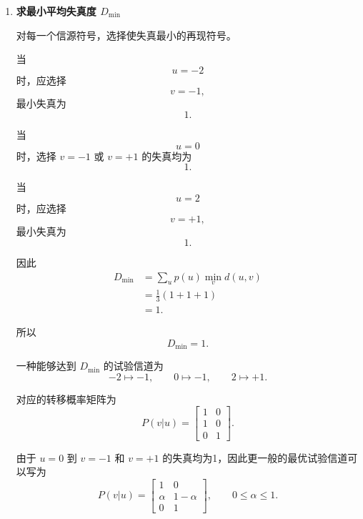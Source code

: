 \documentclass[UTF8,a4paper,12pt]{ctexart}
\begin{document}
\begin{enumerate}[label=\arabic*., leftmargin=2.2em]
更一般地，只要输出与输入无关，即
\[
P(v|u)
=
\begin{bmatrix}
q&1-q\\
q&1-q\\
q&1-q
\end{bmatrix},
\qquad
0\leq q\leq1,
\]
均有
\[
\overline D=\frac{11}{3}.
\]


\item \textbf{求最小平均失真度 $D_{\min}$}

对每一个信源符号，选择使失真最小的再现符号。

当
\[
u=-2
\]
时，应选择
\[
v=-1,
\]
最小失真为
\[
1.
\]

当
\[
u=0
\]
时，选择 $v=-1$ 或 $v=+1$ 的失真均为
\[
1.
\]

当
\[
u=2
\]
时，应选择
\[
v=+1,
\]
最小失真为
\[
1.
\]

因此
\[
\begin{aligned}
D_{\min}
&=
\sum_u p(u)\min_v d(u,v)\\
&=
\frac13(1+1+1)\\
&=1.
\end{aligned}
\]

所以
\[
\boxed{D_{\min}=1}.
\]

一种能够达到 $D_{\min}$ 的试验信道为
\[
-2\mapsto-1,
\qquad
0\mapsto-1,
\qquad
2\mapsto+1.
\]

对应的转移概率矩阵为
\[
\boxed{
P(v|u)
=
\begin{bmatrix}
1&0\\
1&0\\
0&1
\end{bmatrix}
}.
\]

由于 $u=0$ 到 $v=-1$ 和 $v=+1$ 的失真均为1，因此更一般的最优试验信道可以写为
\[
\boxed{
P(v|u)
=
\begin{bmatrix}
1&0\\
\alpha&1-\alpha\\
0&1
\end{bmatrix},
\qquad
0\leq\alpha\leq1
}.
\]

\end{enumerate}
\end{document}
